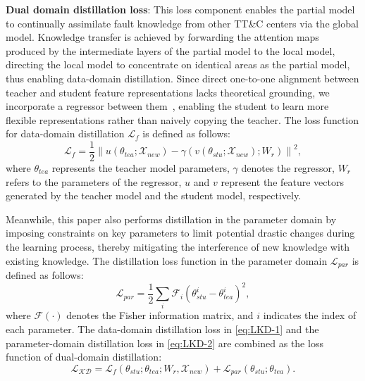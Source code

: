 \textbf{Dual domain distillation loss}: 
This loss component enables the partial model to continually assimilate fault knowledge from other TT\&C centers via the global model. 
Knowledge transfer is achieved by forwarding the attention maps produced by the intermediate layers of the partial model to the local model, 
directing the local model to concentrate on identical areas as the partial model, 
thus enabling data-domain distillation. 
Since direct one-to-one alignment between teacher and student feature representations lacks theoretical grounding, we incorporate a regressor between them~\cite{romero2014fitnets}, enabling the student to learn more flexible representations rather than naively copying the teacher.
The loss function for data-domain distillation ${\mathcal L_{f}}$ is defined as follows:
\begin{equation}
	{\mathcal L_{f}} = \frac{1}{2}{\left\| {u\left( {{{\theta _{tea}}}; {\mathcal X_{new}}} \right) - \gamma \left( {v\left( {\theta _{stu}; {\mathcal X_{new}}} \right); {W_r}} \right)} \right\|^2},
	\label{eq:LKD-1}
\end{equation}
\noindent where ${\theta _{tea}}$ represents the teacher model parameters, 
$\gamma $ denotes the regressor, ${W_r}$ refers to the parameters of the regressor, 
$u$ and $v$ represent the feature vectors generated by the teacher model and the student model, respectively. 

Meanwhile, this paper also performs distillation in the parameter domain by imposing constraints on key parameters 
to limit potential drastic changes during the learning process, 
thereby mitigating the interference of new knowledge with existing knowledge. 
The distillation loss function in the parameter domain ${\mathcal L_{par}}$ is defined as follows:
\begin{equation}
	{\mathcal L_{par}} = \frac{1}{2}\sum\limits_i {{\mathcal F_i}{{\left( {\theta _{stu}^i - \theta _{tea}^i} \right)}^2}},
	\label{eq:LKD-2}
\end{equation}
where $\mathcal F\left( \cdot \right)$ denotes the Fisher information matrix, and $i$ indicates the index of each parameter. 
The data-domain distillation loss in \eqref{eq:LKD-1} and the parameter-domain distillation loss in \eqref{eq:LKD-2}
are combined as the loss function of dual-domain distillation:
\begin{equation}
	{\mathcal {L_{KD}}} = {\mathcal L_{f}}\left( {{\theta _{stu}};{\theta _{tea}};{W_r},{\mathcal X_{new}}} \right) + {\mathcal L_{par}}\left( {{\theta _{stu}};{\theta _{tea}}} \right).
\end{equation}


